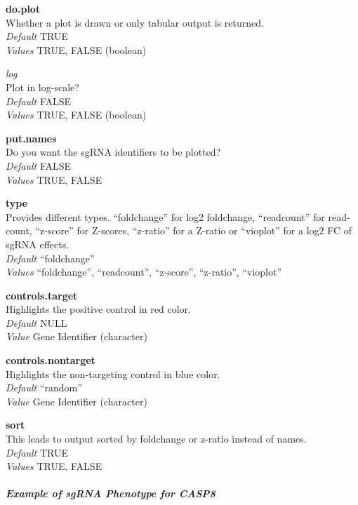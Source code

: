 \documentclass[]{article}
\let\oldsubparagraph\subparagraph
\renewcommand{\subparagraph}[1]{\oldsubparagraph{#1}\mbox{}}
\begin{document}
\textbf{do.plot}\\
Whether a plot is drawn or only tabular output is returned.\\
\emph{Default} TRUE\\
\emph{Values} TRUE, FALSE (boolean)

\emph{log}\\
Plot in log-scale?\\
\emph{Default} FALSE\\
\emph{Values} TRUE, FALSE (boolean)

\textbf{put.names}\\
Do you want the sgRNA identifiers to be plotted?\\
\emph{Default} FALSE\\
\emph{Values} TRUE, FALSE

\textbf{type}\\
Provides different types. ``foldchange'' for log2 foldchange,
``readcount'' for read-count, ``z-score'' for Z-scores, ``z-ratio'' for
a Z-ratio or ``vioplot'' for a log2 FC of sgRNA effects.\\
\emph{Default} ``foldchange''\\
\emph{Values} ``foldchange'', ``readcount'', ``z-score'', ``z-ratio'',
``vioplot''

\textbf{controls.target}\\
Highlights the positive control in red color.\\
\emph{Default} NULL\\
\emph{Value} Gene Identifier (character)

\textbf{controls.nontarget}\\
Highlights the non-targeting control in blue color.\\
\emph{Default} ``random''\\
\emph{Value} Gene Identifier (character)

\textbf{sort}\\
This leads to output sorted by foldchange or z-ratio instead of names.\\
\emph{Default} TRUE\\
\emph{Values} TRUE, FALSE

\subparagraph{Example of sgRNA Phenotype for
CASP8}\label{example-of-sgrna-phenotype-for-casp8}
\end{document}
